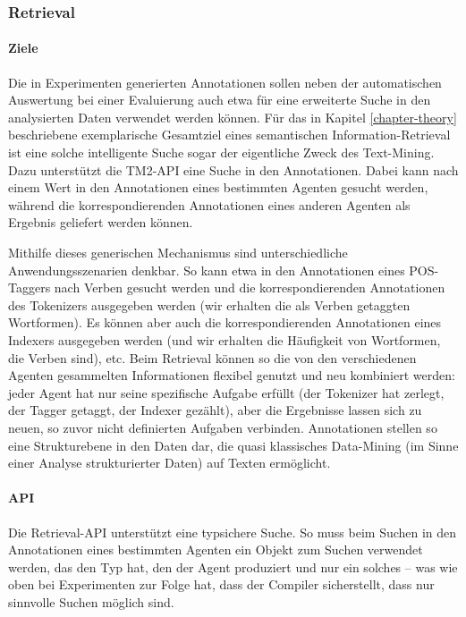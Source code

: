 \documentclass[abstracton, 12pt]{scrartcl}
\begin{document}
\subsubsection{Retrieval} \label{api-retrieval}

\paragraph{Ziele}

Die in Experimenten generierten Annotationen sollen neben der automatischen Auswertung bei einer Evaluierung auch etwa für eine erweiterte Suche in den analysierten Daten verwendet werden können. Für das in Kapitel \ref{chapter-theory} beschriebene exemplarische Gesamtziel eines semantischen Information-Retrieval ist eine solche intelligente Suche sogar der eigentliche Zweck des Text-Mining. Dazu unterstützt die TM2-API eine Suche in den Annotationen. Dabei kann nach einem Wert in den Annotationen eines bestimmten Agenten gesucht werden, während die korrespondierenden Annotationen eines anderen Agenten als Ergebnis geliefert werden können.

Mithilfe dieses generischen Mechanismus sind unterschiedliche Anwendungsszenarien denkbar. So kann etwa in den Annotationen eines POS-Taggers nach Verben gesucht werden und die korrespondierenden Annotationen des Tokenizers ausgegeben werden (wir erhalten die als Verben getaggten Wortformen). Es können aber auch die korrespondierenden Annotationen eines Indexers ausgegeben werden (und wir erhalten die Häufigkeit von Wortformen, die Verben sind), etc. Beim Retrieval können so die von den verschiedenen Agenten gesammelten Informationen flexibel genutzt und neu kombiniert werden: jeder Agent hat nur seine spezifische Aufgabe erfüllt (der Tokenizer hat zerlegt, der Tagger getaggt, der Indexer gezählt), aber die Ergebnisse lassen sich zu neuen, so zuvor nicht definierten Aufgaben verbinden. Annotationen stellen so eine Strukturebene in den Daten dar, die quasi klassisches Data-Mining (im Sinne einer Analyse strukturierter Daten) auf Texten ermöglicht.

\paragraph{API}

Die Retrieval-API unterstützt eine typsichere Suche. So muss beim Suchen in den Annotationen eines bestimmten Agenten ein Objekt zum Suchen verwendet werden, das den Typ hat, den der Agent produziert und nur ein solches -- was wie oben bei Experimenten zur Folge hat, dass der Compiler sicherstellt, dass nur sinnvolle Suchen möglich sind.
\end{document}
